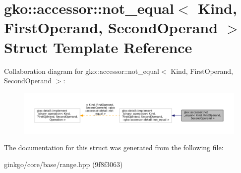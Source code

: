 \hypertarget{structgko_1_1accessor_1_1not__equal}{}\section{gko\+:\+:accessor\+:\+:not\+\_\+equal$<$ Kind, First\+Operand, Second\+Operand $>$ Struct Template Reference}
\label{structgko_1_1accessor_1_1not__equal}


Collaboration diagram for gko\+:\+:accessor\+:\+:not\+\_\+equal$<$ Kind, First\+Operand, Second\+Operand $>$\+:
\nopagebreak
\begin{figure}[H]
\begin{center}
\leavevmode
\includegraphics[width=350pt]{structgko_1_1accessor_1_1not__equal__coll__graph}
\end{center}
\end{figure}


The documentation for this struct was generated from the following file\+:\begin{DoxyCompactItemize}
\item 
ginkgo/core/base/range.\+hpp (9f8f3063)\end{DoxyCompactItemize}
